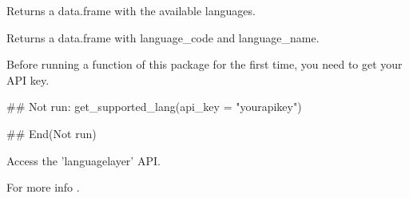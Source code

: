 \documentclass[a4paper]{book}
\begin{document}
%
\begin{Details}\relax
Returns a data.frame with the available languages.
\end{Details}
%
\begin{Value}
Returns a data.frame with language\_code and language\_name.
\end{Value}
%
\begin{Note}\relax
Before running a function of this package for the first time, you need to get your API key.
\end{Note}
%
\begin{Examples}
\begin{ExampleCode}
## Not run: 
get_supported_lang(api_key = "yourapikey")

## End(Not run)
\end{ExampleCode}
\end{Examples}
%
\begin{Description}\relax
Access the 'languagelayer' API.
\end{Description}
%
\begin{Details}\relax
For more info .
\end{Details}
\printindex{}
\end{document}
